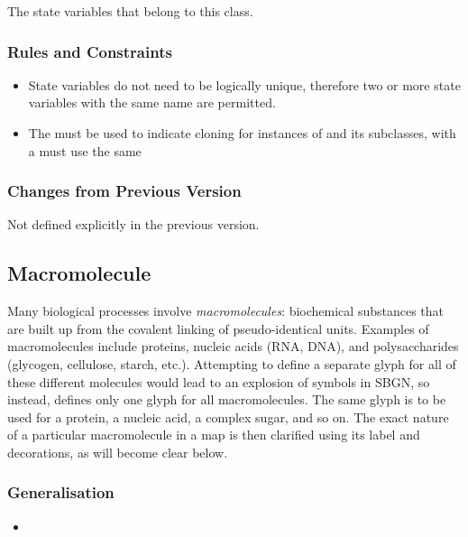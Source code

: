 \begin{attributes}
 The state variables
  that belong to this class.
\end{attributes}

\subsubsection{Rules and Constraints}

\begin{itemize}
\item State variables do not need to be logically unique, therefore
  two or more state variables with the same name are permitted.
\item The  must be used to indicate
  cloning for instances of  and its subclasses,
  with a must use the same 
\end{itemize}

\subsubsection{Changes from Previous Version}

Not defined explicitly in the previous version.

\subsection{Macromolecule}
\label{sec:macromolecule}

Many biological processes involve \emph{macromolecules}: biochemical
substances that are built up from the covalent linking of
pseudo-identical units.  Examples of macromolecules include proteins,
nucleic acids (RNA, DNA), and polysaccharides (glycogen, cellulose,
starch, etc.).  Attempting to define a separate glyph for all of these
different molecules would lead to an explosion of symbols in SBGN, so
instead, \SBGNPDLone defines only one glyph for all macromolecules.
The same glyph is to be used for a protein, a nucleic acid, a complex
sugar, and so on.  The exact nature of a particular macromolecule in a
map is then clarified using its label and decorations, as will become
clear below.

\subsubsection{Generalisation}

\begin{itemize}
\item {}
\end{itemize}

